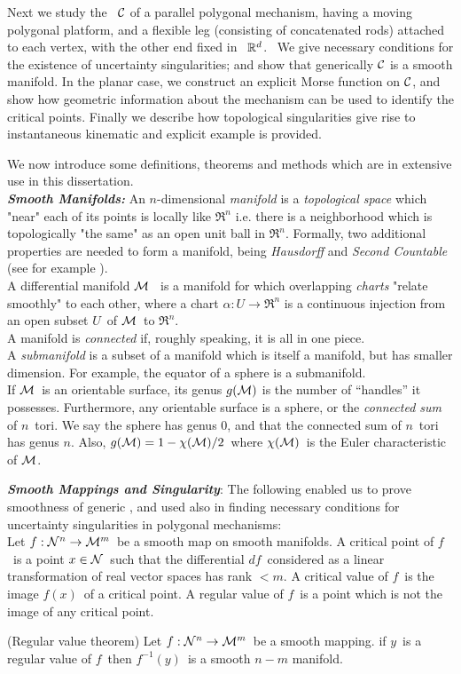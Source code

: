 Next we study the  \cspace\ $\mathcal{C}$ of a parallel polygonal
mechanism, having a moving polygonal platform, and a flexible leg
(consisting of concatenated rods) attached to each vertex, with
the other end fixed in  \ ${\mathbb R}^{d}$. \ We give necessary conditions
for the existence of uncertainty singularities; and show that
generically $\mathcal{C}$ is a smooth manifold. In the planar case, we
construct an explicit Morse function on $\mathcal{C}$, and show how
geometric information about the mechanism can be used to identify
the critical points. Finally we describe how topological
singularities give rise to instantaneous kinematic and explicit
example is provided.




We now introduce some definitions, theorems and methods which are
in extensive use in this dissertation.\\
\emph{\textbf{Smooth Manifolds:}} An $n$-dimensional
\emph{manifold} is a \emph{topological space} which "near" each of
its points is locally like $\Re^n$ i.e. there is a neighborhood
which is topologically "the same" as an open unit ball in $\Re^n$.
Formally, two additional properties are needed to form a manifold,
being \emph{Hausdorff}
and \emph{Second Countable} (see for example \cite{C}).\\
A differential manifold $\mathcal{M}$ \ is a manifold for which overlapping
\emph{charts} "relate smoothly" to each other, where a chart
$\alpha:U\to\Re^n$ is a continuous injection from an open subset
$U$\ of $\mathcal{M}$\ to $\Re^n$.\\
A manifold is \emph{connected} if, roughly speaking, it is all in one piece.\\
A \emph{submanifold} is a subset of a manifold which is itself a
manifold, but has smaller dimension. For example, the equator of a sphere is a submanifold.\\
If $\mathcal{M}$\ is an orientable surface, its genus $g(\mathcal{M})$ is the number
of ``handles'' it possesses. Furthermore, any orientable surface
is a sphere, or the \emph{connected sum} of $n$\ tori. We say the
sphere has genus $0$, and that the connected sum of $n$\ tori has
genus $n$. Also, $g(\mathcal{M})=1-\chi(\mathcal{M})/2$\ where $\chi(\mathcal{M})$\ is the
Euler characteristic of $\mathcal{M}$.

\emph{\textbf{Smooth Mappings and Singularity}}: The following
enabled us to prove smoothness of generic \smech , and used also
in finding necessary conditions for uncertainty singularities in
polygonal mechanisms:\\
Let $f:\mathcal{N}^n\to\mathcal{M}^m$\ be a smooth map on smooth manifolds. A
critical point of $f$\ is a point $x\in\mathcal{N}$\ such that the
differential $df$\ considered as a linear transformation of real
vector spaces has rank $<m$. A critical value of $f$\ is the image
$f(x)$\ of a critical point. A regular value of $f$\ is a point
which is not the image of any critical point.
\begin{thm}(Regular value theorem) Let $f:\mathcal{N}^n\to\mathcal{M}^m$\ be a smooth mapping. if $y$\ is a regular
value of $f$\ then $f^{-1}(y)$\ is a smooth $n-m$ manifold.
\end{thm}


